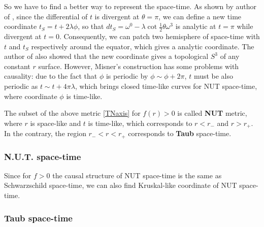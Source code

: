 \documentclass[12pt, a4paper]{article}
\numberwithin{equation}{section}
\begin{document}
So we have to find a better way to represent the space-time. As shown by author of \cite{Misner:1963ss}, since the differential of $t$ is divergent at $\theta = \pi$, we can define a new time coordinate $t_S = t + 2\lambda \phi$, so that $dt_S = \omega^0 -\lambda \cot\frac{1}{2}\theta \omega^3$ is analytic at $t = \pi$ while divergent at $t = 0$. Consequently, we can patch two hemisphere of space-time with $t$ and $t_S$ respectively around the equator, which gives a analytic coordinate. The author of \cite{Misner:1963ss} also showed that the new coordinate gives a topological $S^3$ of any constant $r$ surface.\cite{Griffiths:2009gr} However, Misner's construction has some problems with causality: due to the fact that $\phi$ is periodic by $\phi \sim \phi + 2\pi$, $t$ must be also periodic as $t \sim t + 4\pi\lambda$, which brings closed time-like curves for NUT space-time, where coordinate $\phi$ is time-like.

The subset of the above metric \ref{TNaxis} for $f(r) > 0$ is called \textbf{NUT} metric, where $r$ is space-like and $t$ is time-like, which corresponds to $r < r_-$ and $r > r_+$. In the contrary, the region $r_- < r < r_+$ corresponds to \textbf{Taub} space-time.

\subsubsection{N.U.T. space-time}
Since for $f>0$ the causal structure of NUT space-time is the same as Schwarzschild space-time, we can also find Kruskal-like coordinate of NUT space-time.\cite{Miller:1971ie}\cite{Griffiths:2009gr}

\subsubsection{Taub space-time}
\end{document}
